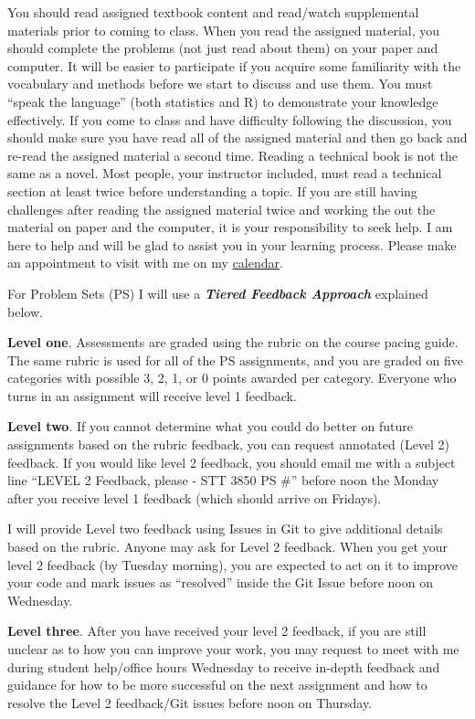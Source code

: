 \documentclass[
]{article}
\begin{document}
You should read assigned textbook content and read/watch supplemental
materials prior to coming to class. When you read the assigned material,
you should complete the problems (not just read about them) on your
paper and computer. It will be easier to participate if you acquire some
familiarity with the vocabulary and methods before we start to discuss
and use them. You must ``speak the language'' (both statistics and R) to
demonstrate your knowledge effectively. If you come to class and have
difficulty following the discussion, you should make sure you have read
all of the assigned material and then go back and re-read the assigned
material a second time. Reading a technical book is not the same as a
novel. Most people, your instructor included, must read a technical
section at least twice before understanding a topic. If you are still
having challenges after reading the assigned material twice and working
the out the material on paper and the computer, it is your
responsibility to seek help. I am here to help and will be glad to
assist you in your learning process. Please make an appointment to visit
with me on my
\href{https://calendar.google.com/calendar/u/0/selfsched?sstoken=UUtZb3I1Z1pFczdjfGRlZmF1bHR8MTZjOTU5MGY0ZTFlOTA2MmExNzhlYWQ5MGIzZWQ0OGM}{calendar}.

For Problem Sets (PS) I will use a \textbf{\emph{Tiered Feedback
Approach}} explained below.

\textbf{Level one}. Assessments are graded using the rubric on the
course pacing guide. The same rubric is used for all of the PS
assignments, and you are graded on five categories with possible 3, 2,
1, or 0 points awarded per category. Everyone who turns in an assignment
will receive level 1 feedback.

\textbf{Level two}. If you cannot determine what you could do better on
future assignments based on the rubric feedback, you can request
annotated (Level 2) feedback. If you would like level 2 feedback, you
should email me with a subject line ``LEVEL 2 Feedback, please - STT
3850 PS \#'' before noon the Monday after you receive level 1 feedback
(which should arrive on Fridays).

I will provide Level two feedback using Issues in Git to give additional
details based on the rubric. Anyone may ask for Level 2 feedback. When
you get your level 2 feedback (by Tuesday morning), you are expected to
act on it to improve your code and mark issues as ``resolved'' inside
the Git Issue before noon on Wednesday.

\textbf{Level three}. After you have received your level 2 feedback, if
you are still unclear as to how you can improve your work, you may
request to meet with me during student help/office hours Wednesday to
receive in-depth feedback and guidance for how to be more successful on
the next assignment and how to resolve the Level 2 feedback/Git issues
before noon on Thursday.
\end{document}
